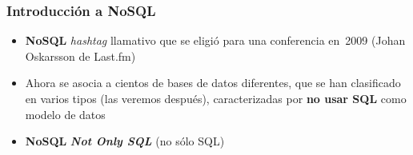 \begin{frame}
  \frametitle{Introducción a NoSQL}
\begin{itemize}
\item {\bf NoSQL} \ra{} {\em hashtag\/} llamativo que se
  eligió para una conferencia en~2009 (Johan Oskarsson de Last.fm)
\item Ahora se asocia a cientos de bases de datos diferentes,
  que se han clasificado en varios tipos (las veremos después),
  caracterizadas por {\bf no usar SQL} como modelo de datos
\item {\bf NoSQL} \ra{} {\bfseries\itshape Not Only SQL} (no sólo SQL)
  \end{itemize}
\end{frame}



